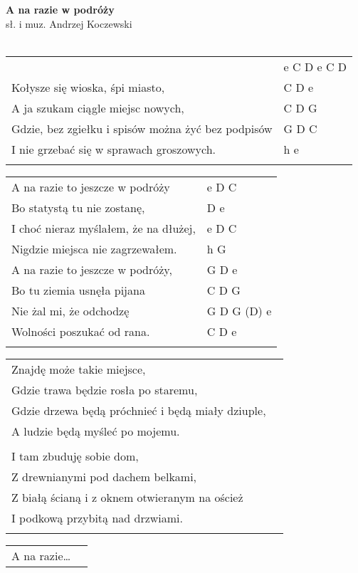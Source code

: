 \documentclass[a5paper]{article}
\begin{document}


\noindent
\fontsize{12pt}{15pt}\selectfont
\textbf{A na razie w podróży} \\
\fontsize{8pt}{10pt}\selectfont
sł. i muz. Andrzej Koczewski \\ \\
\fontsize{10pt}{12pt}\selectfont
{}
\begin{tabular}{@{}p{8.5cm}p{3cm}@{}}
\noindent
	& e C D e C D \\ 
Kołysze się wioska, śpi miasto, & C D e \\
A ja szukam ciągle miejsc nowych, & C D G \\
Gdzie, bez zgiełku i spisów można żyć bez podpisów & G D C \\
I nie grzebać się w sprawach groszowych. & h e \\ \\
\end{tabular}

\noindent
\begin{tabular}{@{}p{7.5cm}p{3cm}@{}}
A na razie to jeszcze w podróży & e D C \\
Bo statystą tu nie zostanę, & D e \\
I choć nieraz myślałem, że na dłużej, & e D C \\
Nigdzie miejsca nie zagrzewałem. & h G \\
A na razie to jeszcze w podróży, & G D e \\
Bo tu ziemia usnęła pijana & C D G \\
Nie żal mi, że odchodzę & G D G (D) e \\
Wolności poszukać od rana. & C D e \\ \\
\end{tabular}

\noindent
\begin{tabular}{@{}p{8.5cm}p{3cm}@{}}
Znajdę może takie miejsce, \\
Gdzie trawa będzie rosła po staremu, \\
Gdzie drzewa będą próchnieć i będą miały dziuple, \\
A ludzie będą myśleć po mojemu. \\ \\
I tam zbuduję sobie dom, \\
Z drewnianymi pod dachem belkami, \\
Z białą ścianą i z oknem otwieranym na oścież \\
I podkową przybitą nad drzwiami. \\ \\
\end{tabular}

\noindent
\begin{tabular}{@{}p{8.5cm}p{3cm}@{}}
A na razie…
\end{tabular}
\end{document}
